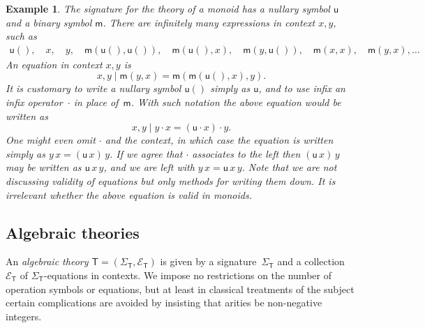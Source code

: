 \documentclass{amsart}
\newcommand{\theory}[1]{\mathsf{#1}} %
\newcommand{\signature}[1]{\Sigma_{\theory{#1}}} %
\newcommand{\equations}[1]{\mathcal{E}_{\theory{#1}}} %
\newtheorem{example}[definition]{Example}
\begin{document}
\begin{example}
  \label{ex:monoid-signature}
  The signature for the theory of a monoid has a nullary symbol $\mathsf{u}$ and a binary
  symbol $\mathsf{m}$. There are infinitely many expressions in context $x, y$, such as
  \begin{align*}
    \mathsf{u}(),\quad
    x,\quad
    y,\quad
    \mathsf{m}(\mathsf{u}(), \mathsf{u}()),\quad
    \mathsf{m}(\mathsf{u}(), x),\quad
    \mathsf{m}(y, \mathsf{u}()),\quad
    \mathsf{m}(x, x),\quad
    \mathsf{m}(y, x),
    \ldots
  \end{align*}
  An equation in context $x, y$ is
  \begin{equation*}
    x, y \mid \mathsf{m}(y, x) = \mathsf{m}(\mathsf{m}(\mathsf{u}(), x), y).
  \end{equation*}
  It is customary to write a nullary symbol $\mathsf{u}()$ simply as $\mathsf{u}$, and to
  use infix an infix operator~$\cdot$ in place of~$\mathsf{m}$. With such notation the
  above equation would be written as
  \begin{equation*}
    x, y \mid y \cdot x = (\mathsf{u} \cdot x) \cdot y.
  \end{equation*}
  One might even omit $\cdot$ and the context, in which case the equation is written
  simply as $y \, x = (\mathsf{u} \, x) \, y$. If we agree that $\cdot$ associates to the
  left then $(\mathsf{u} \, x) \, y$ may be written as $\mathsf{u} \, x \, y$, and we are
  left with $y \, x = \mathsf{u} \, x \, y$. Note that we are \emph{not} discussing
  validity of equations but only methods for writing them down. It is irrelevant whether
  the above equation is valid in monoids.
\end{example}


\subsection{Algebraic theories}
\label{sec:algebraic-theories-1}

An \emph{algebraic theory $\theory{T} = (\signature{T}, \equations{T})$} is given by a
signature~$\signature{T}$ and a collection $\equations{T}$ of $\signature{T}$-equations in
contexts.
%
We impose no restrictions on the number of operation symbols or equations, but at least in
classical treatments of the subject certain complications are avoided by insisting that
arities be non-negative integers.
\end{document}
